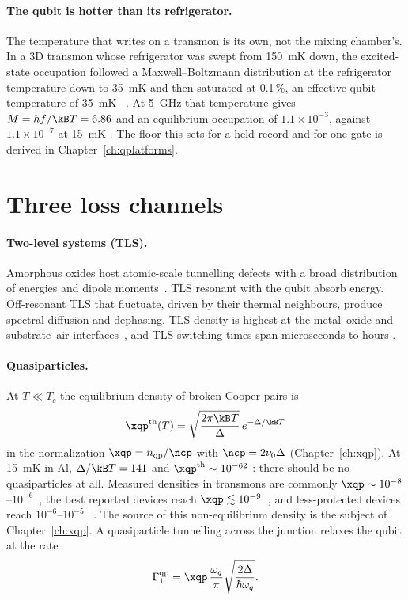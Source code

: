 \paragraph{The qubit is hotter than its refrigerator.} The temperature that writes on a transmon is its own, not the mixing chamber's. In a
3D transmon whose refrigerator was swept from 150~mK down, the excited-state occupation followed a Maxwell--Boltzmann distribution at the
refrigerator temperature down to 35~mK and then saturated at 0.1\,\%, an effective qubit temperature of 35~mK~\cite{Jin2015} \observed. At
5~GHz that temperature gives $M=hf/\kB T=6.86$ and an equilibrium occupation of $1.1\times10^{-3}$, against $1.1\times10^{-7}$ at 15~mK
\calc. The floor this sets for a held record and for one gate is derived in Chapter~\ref{ch:qplatforms}.

\section{Three loss channels}

\paragraph{Two-level systems (TLS).} Amorphous oxides host atomic-scale tunnelling defects
with a broad distribution of energies and dipole moments~\cite{Phillips1987,Muller2019}. TLS
resonant with the qubit absorb energy. Off-resonant TLS that fluctuate, driven by their
thermal neighbours, produce spectral diffusion and dephasing. TLS density is highest at the
metal--oxide and substrate--air interfaces~\cite{Wang2015TLS,Lisenfeld2019}, and TLS switching
times span microseconds to hours \observed.

\paragraph{Quasiparticles.} At $T\ll T_c$ the equilibrium density of broken Cooper pairs is~\cite{Glazman2021}
\begin{equation}
 \xqp^{\mathrm{th}}(T)=\sqrt{\frac{2\pi\kB T}{\Delta}}\,e^{-\Delta/\kB T}
\end{equation}
in the normalization $\xqp=n_{\mathrm{qp}}/\ncp$ with $\ncp=2\nu_0\Delta$ (Chapter~\ref{ch:xqp}).
At 15~mK in Al, $\Delta/\kB T=141$ and $\xqp^{\mathrm{th}}\sim10^{-62}$ \calc: there should be no
quasiparticles at all. Measured densities in transmons are commonly
$\xqp\sim10^{-8}$--$10^{-6}$~\cite{Riste2013,Serniak2018}, the best reported devices reach
$\xqp\lesssim10^{-9}$~\cite{Connolly2024}, and less-protected devices reach
$10^{-6}$--$10^{-5}$~\cite{Martinis2009,deVisser2011} \observed. The source of this non-equilibrium
density is the subject of Chapter~\ref{ch:xqp}. A quasiparticle tunnelling across the
junction relaxes the qubit at the rate~\cite{Catelani2011}
\begin{equation}
 \Gamma_1^{\mathrm{qp}}=\xqp\,\frac{\omega_q}{\pi}\sqrt{\frac{2\Delta}{\hbar\omega_q}} .
 \label{eq:catelani}
\end{equation}

